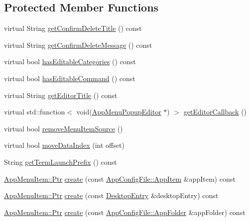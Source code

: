 \subsection*{Protected Member Functions}
\begin{DoxyCompactItemize}
\item 
virtual String \mbox{\hyperlink{classAppMenuItem_a93bd0cf3b4e28d09a4975023b383c1dc}{get\+Confirm\+Delete\+Title}} () const
\item 
virtual String \mbox{\hyperlink{classAppMenuItem_ac5922f3ac33054ecd54bb3fab692d639}{get\+Confirm\+Delete\+Message}} () const
\item 
virtual bool \mbox{\hyperlink{classAppMenuItem_aa9656d7c1a2dd93bd02f119c0efbb2e0}{has\+Editable\+Categories}} () const
\item 
virtual bool \mbox{\hyperlink{classAppMenuItem_a295fde428e713a8c891dc19b5048c373}{has\+Editable\+Command}} () const
\item 
virtual String \mbox{\hyperlink{classAppMenuItem_a4f0501780311afb7630d99b9e84a5c9d}{get\+Editor\+Title}} () const
\item 
virtual std\+::function$<$ void(\mbox{\hyperlink{classAppMenuPopupEditor}{App\+Menu\+Popup\+Editor}} $\ast$) $>$ \mbox{\hyperlink{classAppMenuItem_af742017ff127e5f36da1e206205c86ee}{get\+Editor\+Callback}} ()
\item 
virtual bool \mbox{\hyperlink{classAppMenuItem_a5a156a436279e0319c7960ac2931b14d}{remove\+Menu\+Item\+Source}} ()
\item 
virtual bool \mbox{\hyperlink{classAppMenuItem_a66b922c9168e1df29f61ca6e98726d16}{move\+Data\+Index}} (int offset)
\item 
String \mbox{\hyperlink{classAppMenuItem_a69db4f9d28f63428fcdfb283f77aeb5f}{get\+Term\+Launch\+Prefix}} () const
\item 
\mbox{\hyperlink{classAppMenuItem_ab5f51c5d74f8df62b8862c0cc8126cb7}{App\+Menu\+Item\+::\+Ptr}} \mbox{\hyperlink{classAppMenuItem_a4130e499b6bfd43b32fde384e3a90d4a}{create}} (const \mbox{\hyperlink{structAppConfigFile_1_1AppItem}{App\+Config\+File\+::\+App\+Item}} \&app\+Item) const
\item 
\mbox{\hyperlink{classAppMenuItem_ab5f51c5d74f8df62b8862c0cc8126cb7}{App\+Menu\+Item\+::\+Ptr}} \mbox{\hyperlink{classAppMenuItem_a624ea6d7559bc01ae14273280467bbdb}{create}} (const \mbox{\hyperlink{classDesktopEntry}{Desktop\+Entry}} \&desktop\+Entry) const
\item 
\mbox{\hyperlink{classAppMenuItem_ab5f51c5d74f8df62b8862c0cc8126cb7}{App\+Menu\+Item\+::\+Ptr}} \mbox{\hyperlink{classAppMenuItem_a7dad9c79d8c97f93b04670f638469c67}{create}} (const \mbox{\hyperlink{structAppConfigFile_1_1AppFolder}{App\+Config\+File\+::\+App\+Folder}} \&app\+Folder) const
\end{DoxyCompactItemize}
